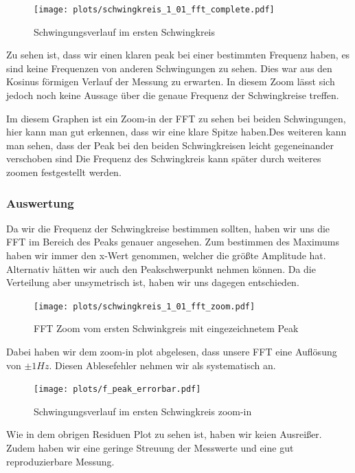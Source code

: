 \documentclass[twoside]{protokoll}
\begin{document}
\begin{figure}[H]
    \centering
    \texttt{[image: plots/schwingkreis\_1\_01\_fft\_complete.pdf]}
    \caption{Schwingungsverlauf im ersten Schwingkreis}
\end{figure}

Zu sehen ist, dass wir einen klaren peak bei einer bestimmten Frequenz haben, es sind keine Frequenzen von anderen Schwingungen zu sehen. 
Dies war aus den Kosinus förmigen Verlauf der Messung zu erwarten. In diesem Zoom lässt sich jedoch noch keine Aussage über die genaue Frequenz der Schwingkreise treffen.


Im diesem Graphen ist ein Zoom-in der FFT zu sehen bei beiden Schwingungen, hier kann man gut erkennen, dass wir eine klare Spitze haben.Des weiteren kann man sehen, dass der Peak bei den beiden Schwingkreisen leicht gegeneinander verschoben sind 
Die Frequenz des Schwingkreis kann später durch weiteres zoomen festgestellt werden.


\subsubsection{Auswertung}
Da wir die Frequenz der Schwingkreise bestimmen sollten, haben wir uns die FFT im Bereich des Peaks genauer angesehen.
Zum bestimmen des Maximums haben wir immer den x-Wert genommen, welcher die größte Amplitude hat.
Alternativ hätten wir auch den Peakschwerpunkt nehmen können. Da die Verteilung aber unsymetrisch ist, haben wir uns dagegen entschieden.
\begin{figure}[H]
    \centering
    \texttt{[image: plots/schwingkreis\_1\_01\_fft\_zoom.pdf]}
    \caption{FFT Zoom vom ersten Schwinkgreis mit eingezeichnetem Peak}
\end{figure}
Dabei haben wir dem zoom-in plot abgelesen, dass unsere FFT eine Auflösung von $ \pm 1Hz$. Diesen Ablesefehler nehmen wir als systematisch an.

\begin{figure}[H]
    \centering
    \texttt{[image: plots/f\_peak\_errorbar.pdf]}
    \caption{Schwingungsverlauf im ersten Schwingkreis zoom-in}
\end{figure}
Wie in dem obrigen Residuen Plot zu sehen ist, haben wir keien Ausreißer.
Zudem haben wir eine geringe Streuung der Messwerte und eine gut reproduzierbare Messung.
\end{document}
